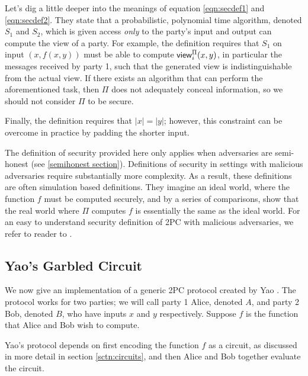 \begin{description}
    Let's dig a little deeper into the meanings of equation \ref{eqn:secdef1} and \ref{eqn:secdef2}.
    They state that a probabilistic, polynomial time algorithm, denoted $S_1$ and $S_2$, which is given access \textit{only} to the party's input and output can compute the view of a party.
    For example, the definition requires that $S_1$ on input $(x, f(x,y))$ must be able to compute ${\sf view}^{\Pi}_i(x,y)$, in particular the messages received by party 1, such that the generated view is indistinguishable from the actual view.
If there exists an algorithm that can perform the aforementioned task, then $\Pi$ does not adequately conceal information, so we should not consider $\Pi$ to be secure.

    Finally, the definition requires that $|x| = |y|$; however, this constraint can be overcome in practice by padding the shorter input.
\end{description}

The definition of security provided here only applies when adversaries are semi-honest (see \ref{semihonest section}).
Definitions of security in settings with malicious adversaries require substantially more complexity.
As a result, these definitions are often simulation based definitions.
They imagine an ideal world, where the function $f$ must be computed securely, and by a series of comparisons, show that the real world where $\Pi$ computes $f$ is essentially the same as the ideal world.
For an easy to understand security definition of 2PC with malicious adversaries, we refer to reader to \cite{lindell2009}.

\subsection{Yao's Garbled Circuit}
We now give an implementation of a generic 2PC protocol created by Yao \cite{yao}.
The protocol works for two parties; we will call party 1 Alice, denoted $A$, and party 2 Bob, denoted $B$, who have inputs $x$ and $y$ respectively.
Suppose $f$ is the function that Alice and Bob wish to compute.

Yao's protocol depends on first encoding the function $f$ as a circuit, as discussed in more detail in section \ref{sctn:circuits}, and then Alice and Bob together evaluate the circuit.



